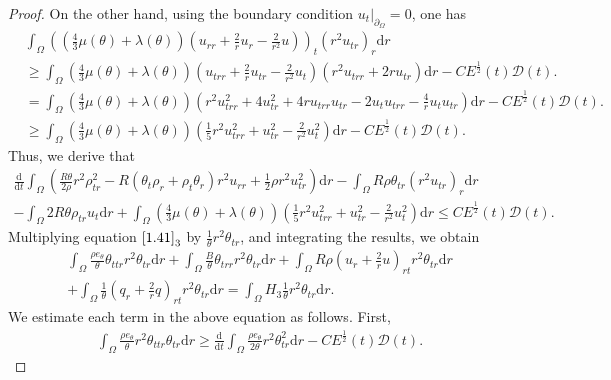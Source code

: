 \documentclass[10pt,a4paper]{amsart}
\newcommand{\dif}{\mathrm{d}}
\begin{document}
\begin{proof}
 On the other hand, using the boundary condition $u_t|_{\partial_\Omega}=0$, one has
 \begin{align*}
& \int_{\Omega}\left( \left(\frac{4}{3} \mu(\theta)+\lambda(\theta)\right)\left(u_{rr}+\frac{2}{r}u_r-\frac{2}{r^2} u\right)\right)_t (r^2 u_{tr})_r \dif r\\
  &\ge \int_{\Omega} \left(\frac{4}{3} \mu(\theta)+\lambda(\theta)\right)\left(u_{trr}+\frac{2}{r}u_{tr}-\frac{2}{r^2} u_t\right) (r^2 u_{trr}+2r u_{tr}) \dif r-CE^\frac{1}{2}(t) \mathcal D(t).\\
  &=\int_{\Omega} \left(\frac{4}{3} \mu(\theta)+\lambda(\theta)\right) \left( r^2 u_{trr}^2+4u_{tr}^2+4r u_{trr} u_{tr} -2 u_t u_{trr}-\frac{4}{r} u_t u_{tr}\right)\dif r-CE^\frac{1}{2}(t) \mathcal D(t).\\
  &\ge   \int_{\Omega} \left(\frac{4}{3} \mu(\theta)+\lambda(\theta)\right)\left(\frac{1}{5} r^2 u_{trr}^2+u_{tr}^2-\frac{2}{r^2} u_t^2\right) \dif r-C E^\frac{1}{2}(t) \mathcal D(t).
  \end{align*}
 Thus, we derive that
 \begin{align}\label{1.43}
 \frac{\dif }{\dif t} \int_{\Omega} \left(\frac{R\theta}{2\rho} r^2 \rho_{tr}^2-R(\theta_t \rho_r+\rho_t\theta_r)r^2u_{rr} +\frac{1}{2} \rho r^2 u_{tr}^2 \right) \dif r -\int_{\Omega} R \rho \theta_{tr} (r^2 u_{tr})_r\dif r \nonumber\\- \int_{\Omega} 2 R\theta \rho_{tr} u_t \dif r
 + \int_{\Omega} \left(\frac{4}{3} \mu(\theta)+\lambda(\theta)\right)\left(\frac{1}{5} r^2 u_{trr}^2+u_{tr}^2-\frac{2}{r^2} u_t^2\right) \dif r \le C E^\frac{1}{2}(t) \mathcal D(t).
 \end{align}
 Multiplying equation $\eqref{1.41}_3$ by $\frac{1}{\theta} r^2 \theta_{tr}$, and integrating the results, we obtain
 \begin{align}
 \int_{\Omega} \frac{\rho e_\theta}{\theta} \theta_{ttr} r^2 \theta_{tr} \dif r+\int_{\Omega} \frac{B}{\theta} \theta_{trr} r^2 \theta_{tr} \dif r+\int_{\Omega} R \rho\left( u_r+\frac{2}{r}u\right)_{rt} r^2 \theta_{tr} \dif r \nonumber \\
 +\int_{\Omega} \frac{1}{\theta} \left( q_r+\frac{2}{r} q\right)_{rt} r^2 \theta_{tr} \dif r =\int_{\Omega} H_3 \frac{1}{\theta} r^2 \theta_{tr} \dif r. \label{1.44}
 \end{align}
 We estimate each term in the above equation as follows.
 First,
 \begin{align*}
 \int_{\Omega} \frac{\rho e_\theta}{\theta} r^2 \theta_{ttr} \theta_{tr} \dif r  \ge \frac{\dif}{\dif t} \int_{\Omega} \frac{\rho e_\theta}{2\theta} r^2 \theta_{tr}^2 \dif r -C E^\frac{1}{2}(t) \mathcal D(t).

\end{align*}
\end{proof}
\end{document}
